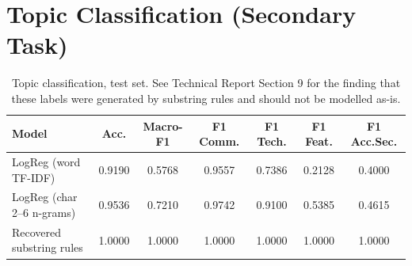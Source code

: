 \documentclass[11pt,a4paper]{article}
\begin{document}
\section{Topic Classification (Secondary Task)}

\begin{table}[H]
\centering
\small
\begin{tabular}{@{}lcccccc@{}}
\toprule
\textbf{Model} & \textbf{Acc.} & \textbf{Macro-F1} & \textbf{F1 Comm.} & \textbf{F1 Tech.} & \textbf{F1 Feat.} & \textbf{F1 Acc.Sec.} \\
\midrule
LogReg (word TF-IDF) & 0.9190 & 0.5768 & 0.9557 & 0.7386 & 0.2128 & 0.4000 \\
LogReg (char 2--6 n-grams) & 0.9536 & 0.7210 & 0.9742 & 0.9100 & 0.5385 & 0.4615 \\
Recovered substring rules & 1.0000 & 1.0000 & 1.0000 & 1.0000 & 1.0000 & 1.0000 \\
\bottomrule
\end{tabular}
\caption{Topic classification, test set. See Technical Report Section 9 for the finding that these labels were generated by substring rules and should not be modelled as-is.}
\end{table}
\end{document}
